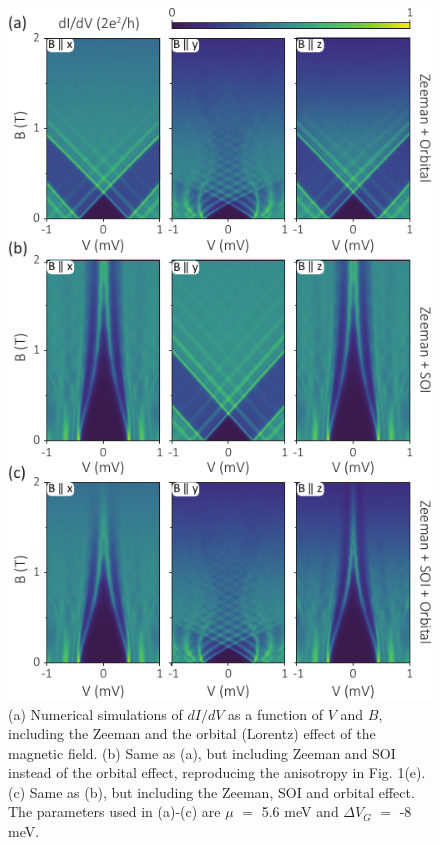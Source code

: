 \begin{figure}
\includegraphics[width=\columnwidth]{chapter_spinorbit/figures/Fig2.pdf}
\caption{\label{fig2}
(a) Numerical simulations of $dI/dV$ as a function of $V$ and $B$, including the Zeeman and the orbital (Lorentz) effect of the magnetic field.
(b) Same as (a), but including Zeeman and SOI instead of the orbital effect, reproducing the anisotropy in Fig. 1(e).
(c) Same as (b), but including the Zeeman, SOI and orbital effect.
The parameters used in (a)-(c) are $\mu$ $=$ 5.6 meV and $\Delta V_G$ $=$ -8 meV.
}
\end{figure}

